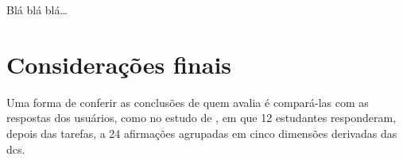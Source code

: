 Blá blá blá…
\section{Considerações finais}
\label{sec:consideracoes-finais}
Uma forma de conferir as conclusões de quem avalia é compará-las com as
respostas dos usuários, como no
estudo de \textcite[p. 1512-1513 e 1519]{zimmerle2025}, em que 12 estudantes
responderam, depois das tarefas, a 24 afirmações agrupadas em cinco
dimensões derivadas das \glspl{dc}.
